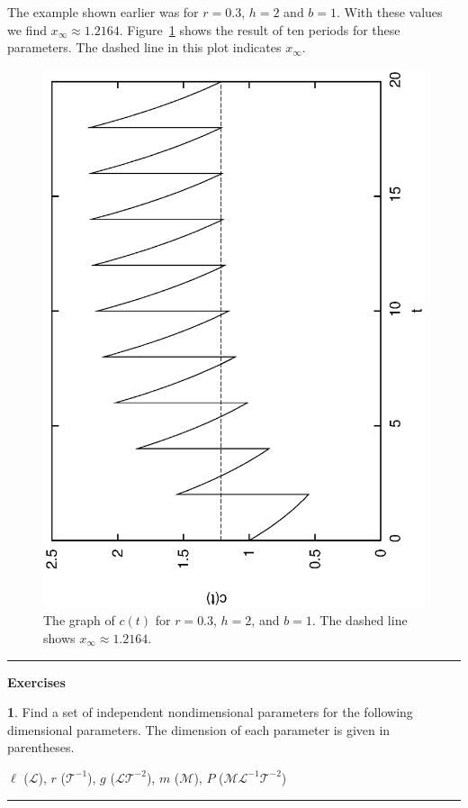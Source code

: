 \documentclass[reqno]{immbook}
\numberwithin{equation}{chapter}
\numberwithin{question}{section}
\numberwithin{theorem}{chapter}
\numberwithin{figure}{chapter}
\theoremstyle{definition}
\newtheorem{exercise}{}[section]
\newenvironment{exercises}%
{%
\medskip\hrule\medskip\noindent\textbf{Exercises}%
}%
{%
\medskip\hrule
}
\begin{document}
The example shown earlier was for $r=0.3$, $h=2$ and $b=1$.
With these values we find $x_{\infty} \approx 1.2164$.
Figure~\ref{fig:PeriodicDrugDosePlotWithXinf}
shows the result of ten periods for these parameters.
The dashed line in this plot indicates $x_{\infty}$.
\begin{figure}
\centerline{%
\includegraphics[angle=270,width=4.5in]{python_PeriodicDrugDose/PeriodicDrugDosePlotWithXinf.eps}
}
\caption{The graph of $c(t)$ for $r=0.3$, $h=2$, and $b=1$.
The dashed line shows $x_{\infty} \approx 1.2164$.}
\label{fig:PeriodicDrugDosePlotWithXinf}
\end{figure}
%

\newpage

\begin{exercises}
\begin{exercise}
\label{ex:Nondim_lrgmP}
Find a set of independent nondimensional parameters for the following
dimensional parameters.  The dimension of each parameter
is given in parentheses.

\centerline{$\ell$ ($\mathcal{L}$), $r$ ($\mathcal{T}^{-1}$),
$g$ ($\mathcal{LT}^{-2}$), $m$ ($\mathcal{M}$),
$P$ ($\mathcal{M}\mathcal{L}^{-1}\mathcal{T}^{-2}$)}
\end{exercise}
\end{exercises}
\end{document}
